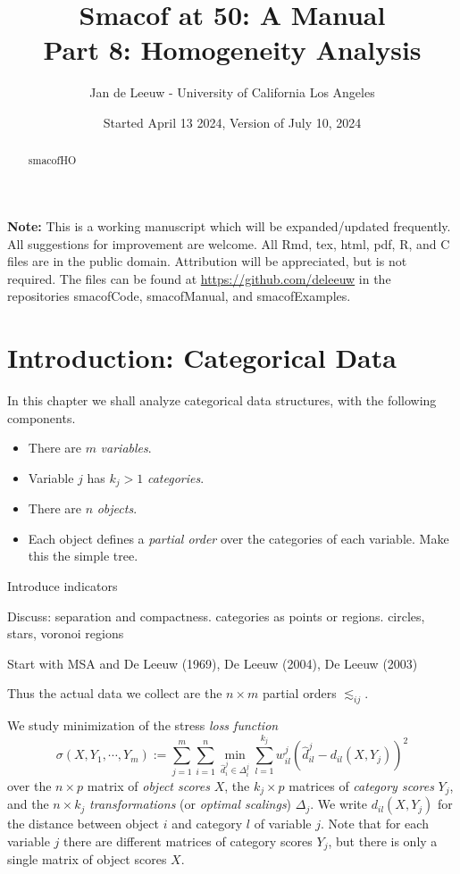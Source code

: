 \documentclass[
  12pt,
]{article}
\title{Smacof at 50: A Manual\\
Part 8: Homogeneity Analysis}
\author{Jan de Leeuw - University of California Los Angeles}
\date{Started April 13 2024, Version of July 10, 2024}
\providecommand{\tightlist}{%
  \setlength{\itemsep}{0pt}\setlength{\parskip}{0pt}}
\begin{document}
\maketitle
\begin{abstract}
smacofHO
\end{abstract}

{
\setcounter{tocdepth}{3}
\tableofcontents
}
\textbf{Note:} This is a working manuscript which will be expanded/updated
frequently. All suggestions for improvement are welcome. All Rmd, tex,
html, pdf, R, and C files are in the public domain. Attribution will be
appreciated, but is not required. The files can be found at
\url{https://github.com/deleeuw} in the repositories smacofCode, smacofManual,
and smacofExamples.

\section{Introduction: Categorical Data}\label{cat}

In this chapter we shall analyze categorical data structures, with the following components.

\begin{itemize}
\tightlist
\item
  There are \(m\) \emph{variables}.
\item
  Variable \(j\) has \(k_j>1\) \emph{categories}.
\item
  There are \(n\) \emph{objects}.
\item
  Each object defines a \emph{partial order} over the categories of each variable. Make this the simple tree.
\end{itemize}

Introduce indicators

Discuss: separation and compactness. categories as points or regions.
circles, stars, voronoi regions

Start with MSA and De Leeuw (1969),
De Leeuw (2004), De Leeuw (2003)

Thus the actual data we collect are the \(n\times m\) partial orders \(\lesssim_{ij}\).

We study minimization of the stress \emph{loss function}
\begin{equation}
\sigma(X,Y_1,\cdots,Y_m):=\sum_{j=1}^m\sum_{i=1}^n\min_{\hat d_i^j\in\Delta_i^j}\sum_{l=1}^{k_j}w_{il}^j(\hat d_{il}^j-d_{il}(X,Y_j))^2
\label{eq:snmu}
\end{equation}
over the \(n\times p\) matrix of \emph{object scores} \(X\), the \(k_j\times p\)
matrices of \emph{category scores} \(Y_j\), and the \(n\times k_j\) \emph{transformations} (or \emph{optimal scalings}) \(\Delta_j\). We write
\(d_{il}(X,Y_j)\) for the distance between object \(i\) and category
\(l\) of variable \(j\). Note that for each variable \(j\) there are different matrices of category scores \(Y_j\), but there is only a single matrix of object scores \(X\).
\end{document}

